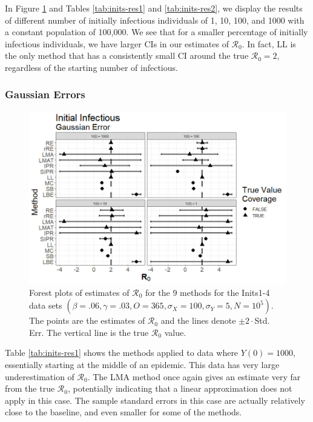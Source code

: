 \documentclass[12pt]{article}
\newcommand{\xxsir}{\ensuremath{9} } %
\newcommand{\rr}{\ensuremath{\mathcal{R}_0}}
\begin{document}
In Figure \ref{fig:inits-res} and Tables \ref{tab:inits-res1} and \ref{tab:inits-res2}, we display the results of different number of initially infectious individuals of 1, 10, 100, and 1000 with a constant population of 100,000.  We see that for a smaller percentage of initially infectious individuals, we have larger CIs in our estimates of $\rr$.  In fact, LL is the only method that has a consistently small CI around the true $\rr=2$, regardless of the starting number of infectious.

\subsubsection{Gaussian Errors}

\begin{figure}[H]
  \centering
  \includegraphics[scale=0.5]{images/start_n.jpg}
    \caption{Forest plots of estimates of $\rr$ for the \xxsir methods for the Inits1-4 data sets $(\beta=.06, \gamma=.03, O=365, \sigma_X=100, \sigma_Y=5, N=10^5)$.  The points are the estimates of $\rr$ and the lines denote $\pm 2\cdot $Std. Err.  The vertical line is the true $\rr$ value.}\label{fig:inits-res}
  \end{figure}

  Table \ref{tab:inits-res1} shows the methods applied to data where $Y(0) = 1000$, essentially starting at the middle of an epidemic. This data has very large underestimation of $\rr$. The LMA method once again gives an estimate very far from the true $\rr$, potentially indicating that a linear approximation does not apply in this case. The sample standard errors in this case are actually relatively close to the baseline, and even smaller for some of the methods.
\end{document}
